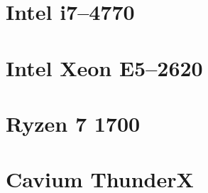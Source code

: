 \documentclass[b5paper]{report}
\begin{document}
\begin{appendices}
\clearpage
\section{Intel\textregistered{} i7--4770}
\begin{figure}[ht]
\end{figure}

\clearpage
\section{Intel\textregistered{} Xeon\textregistered{} E5--2620}
\begin{figure}[ht]
\end{figure}

\clearpage
\section{Ryzen 7 1700}
\begin{figure}[ht]
\end{figure}

\clearpage
\section{Cavium ThunderX}
\begin{figure}[ht]
\end{figure}



\end{appendices}
\end{document}
